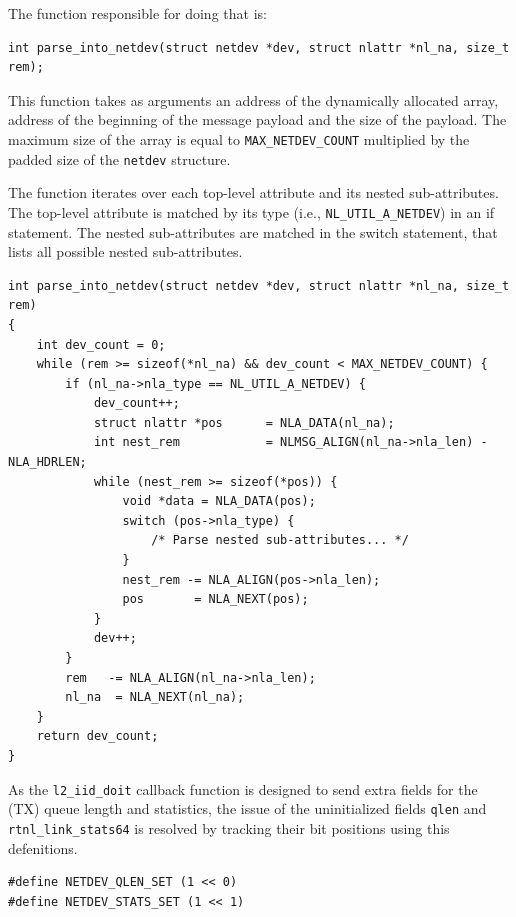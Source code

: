 \documentclass[10pt, letterpaper]{article}
\begin{document}
The function responsible for doing that is:
\begin{lstlisting}[caption={Attribute parsing function signature}]
int parse_into_netdev(struct netdev *dev, struct nlattr *nl_na, size_t rem);
\end{lstlisting}

This function takes as arguments an address of the dynamically allocated array, address of
the beginning of the message payload and the size of the payload. The maximum size of the
array is equal to \texttt{MAX\_NETDEV\_COUNT} multiplied by the padded size of the
\texttt{netdev} structure.

The function iterates over each top-level attribute and its nested sub-attributes. The
top-level attribute is matched by its type (i.e., \texttt{NL\_UTIL\_A\_NETDEV}) in an if
statement. The nested sub-attributes are matched in the switch statement, that lists all
possible nested sub-attributes.

\begin{lstlisting}[caption={Simplified \texttt{parse\_into\_netdev} implementation},label={lst:parse_concise}]
int parse_into_netdev(struct netdev *dev, struct nlattr *nl_na, size_t rem)
{
    int dev_count = 0;
    while (rem >= sizeof(*nl_na) && dev_count < MAX_NETDEV_COUNT) {
        if (nl_na->nla_type == NL_UTIL_A_NETDEV) {
            dev_count++;
            struct nlattr *pos      = NLA_DATA(nl_na);
            int nest_rem            = NLMSG_ALIGN(nl_na->nla_len) - NLA_HDRLEN;
            while (nest_rem >= sizeof(*pos)) {
                void *data = NLA_DATA(pos);
                switch (pos->nla_type) {
                    /* Parse nested sub-attributes... */
                }
                nest_rem -= NLA_ALIGN(pos->nla_len);
                pos       = NLA_NEXT(pos);
            }
            dev++;
        }
        rem   -= NLA_ALIGN(nl_na->nla_len);
        nl_na  = NLA_NEXT(nl_na);
    }
    return dev_count;
}
\end{lstlisting}

As the \texttt{l2\_iid\_doit} callback function is designed to send extra fields for the
(TX) queue length and statistics, the issue of the uninitialized fields \texttt{qlen}  and
\texttt{rtnl\_link\_stats64} is resolved by tracking their bit positions using this
defenitions.
\begin{lstlisting}[caption={Bit positions}]
#define NETDEV_QLEN_SET (1 << 0)
#define NETDEV_STATS_SET (1 << 1)
\end{lstlisting}
\end{document}
